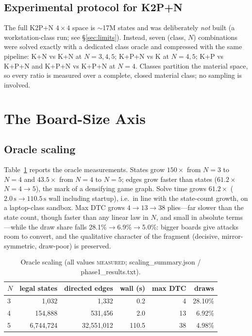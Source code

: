 \documentclass[conference]{IEEEtran}
\newcommand{\tierm}{\textsc{measured}}
\begin{document}
\subsection{Experimental protocol for K2P+N}
The full K2P+N $4\times4$ space is $\sim$17M states and was deliberately
\emph{not} built (a workstation-class run; see \S\ref{sec:limits}). Instead,
seven (class, $N$) combinations were solved exactly with a dedicated class
oracle and compressed with the same pipeline: K+N vs K+N at $N{=}3,4,5$;
K+P+N vs K at $N{=}4,5$; K+P vs K+P+N and K+P+N vs K+P+N at $N{=}4$. Classes
partition the material space, so every ratio is measured over a complete,
closed material class; no sampling is involved.

\section{The Board-Size Axis}
\label{sec:board}

\subsection{Oracle scaling}
Table~\ref{tab:oracle} reports the oracle measurements. States grow
$150\times$ from $N{=}3$ to $N{=}4$ and $43.5\times$ from $N{=}4$ to
$N{=}5$; edges grow faster than states ($61.2\times$ $N{=}4{\to}5$), the
mark of a densifying game graph. Solve time grows $61.2\times$
($2.0\,\mathrm{s} \to 110.5\,\mathrm{s}$ wall including startup), i.e.\ in
line with the state-count growth, on a laptop-class sandbox. Max DTC grows
$4 \to 13 \to 38$ plies---far slower than the
state count, though faster than any linear law in $N$, and small in
absolute terms---while the draw share falls 28.1\%$\to$6.9\%$\to$5.0\%: bigger
boards give attacks room to convert, and the qualitative character of the
fragment (decisive, mirror-symmetric, draw-poor) is preserved.

\begin{table}[t]
\caption{Oracle scaling (all values \tierm{};
scaling\_summary.json / phase1\_results.txt).}
\label{tab:oracle}
\centering
\footnotesize
\setlength{\tabcolsep}{3.2pt}
\begin{tabular}{lrrrrr}
\toprule
$N$ & legal states & directed edges & wall (s) & max DTC & draws \\
\midrule
3 & 1{,}032 & 1{,}332 & 0.2 & 4 & 28.10\% \\
4 & 154{,}888 & 531{,}456 & 2.0 & 13 & 6.92\% \\
5 & 6{,}744{,}724 & 32{,}551{,}012 & 110.5 & 38 & 4.98\% \\
\bottomrule
\end{tabular}
\end{table}
\end{document}
